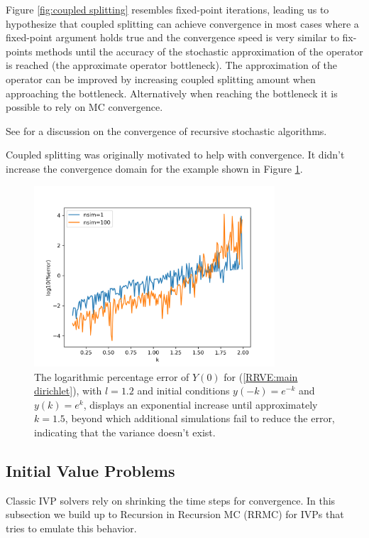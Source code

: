 \documentclass[a4paper,12pt]{article}
\begin{document}
Figure \ref{fig:coupled splitting}
resembles fixed-point iterations, leading us to hypothesize
that coupled splitting can achieve convergence in most cases
where a fixed-point argument holds true and the convergence
speed is very similar to fix-points methods until the accuracy
of the stochastic approximation of the operator is reached
(the approximate operator bottleneck). The approximation of the operator
can be improved by increasing coupled splitting amount when
approaching the bottleneck. Alternatively when reaching
the bottleneck it is possible to rely on MC convergence.

\begin{related}
    See \cite{gupta_convergence_2021} for a discussion on the convergence
    of recursive stochastic algorithms.
\end{related}

Coupled splitting was originally motivated to help with
convergence. It didn't increase the convergence domain for
the example shown in Figure \ref{fig:mainD explosion}.\\

\begin{figure}[h!]
    \centering
    \includegraphics[width=0.8\textwidth]{plots/mainD explosion.png}
    \caption{The logarithmic percentage error of $Y(0)$ for
    (\ref{RRVE:main dirichlet}), with $l=1.2$ and initial conditions
    $y(-k)=e^{-k}$ and $y(k)=e^{k}$, displays an exponential
    increase until approximately $k=1.5$, beyond which additional
    simulations fail to reduce the error, indicating that the variance
    doesn't exist.}
    \label{fig:mainD explosion}
\end{figure}



\subsection{Initial Value Problems}
Classic IVP solvers rely on shrinking the time steps for
convergence. In this subsection we build up to
Recursion in Recursion MC (RRMC) for IVPs that tries to emulate
this behavior.
\end{document}

